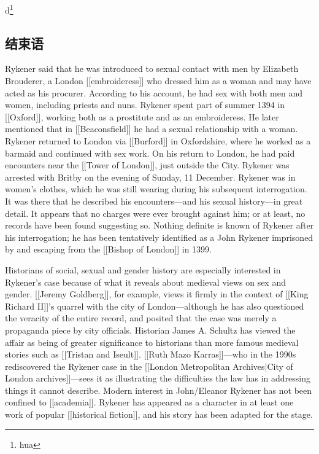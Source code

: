 \documentclass[11pt,a4paper,oneside]{article}
\newcommand{\zhconclusion}{\section*{\heiti\large 结束语}%
\addcontentsline{toc}{section}{\hspace{-1.8pc}\heiti 结束语}}%
\newenvironment{chineseconclusion}{\begin{chconclusion}\zhconclusion}%
{\vspace{1ex}\\ \end{chconclusion}}
\begin{document}
d\footnote{hua}
\newpage
\begin{chineseconclusion}
  Rykener said that he was introduced to sexual contact with men by Elizabeth Brouderer, a London [[embroideress]] who dressed him as a woman and may have acted as his procurer. According to his account, he had sex with both men and women, including priests and nuns. Rykener spent part of summer 1394 in [[Oxford]], working both as a prostitute and as an embroideress. He later mentioned that in [[Beaconsfield]] he had a sexual relationship with a woman. Rykener returned to London via [[Burford]] in Oxfordshire, where he worked as a barmaid and continued with sex work. On his return to London, he had paid encounters near the [[Tower of London]], just outside the City. Rykener was arrested with Britby on the evening of Sunday, 11 December. Rykener was in women's clothes, which he was still wearing during his subsequent interrogation. It was there that he described his encounters—and his sexual history—in great detail. It appears that no charges were ever brought against him; or at least, no records have been found suggesting so. Nothing definite is known of Rykener after his interrogation; he has been tentatively identified as a John Rykener imprisoned by and escaping from the [[Bishop of London]] in 1399.

  Historians of social, sexual and gender history are especially interested in Rykener's case because of what it reveals about medieval views on sex and gender. [[Jeremy Goldberg]], for example, views it firmly in the context of [[King Richard II]]'s quarrel with the city of London—although he has also questioned the veracity of the entire record, and posited that the case was merely a propaganda piece by city officials. Historian James A. Schultz has viewed the affair as being of greater significance to historians than more famous medieval stories such as [[Tristan and Iseult]]. [[Ruth Mazo Karras]]—who in the 1990s rediscovered the Rykener case in the [[London Metropolitan Archives|City of London archives]]—sees it as illustrating the difficulties the law has in addressing things it cannot describe. Modern interest in John/Eleanor Rykener has not been confined to [[academia]]. Rykener has appeared as a character in at least one work of popular [[historical fiction]], and his story has been adapted for the stage.  
\end{chineseconclusion}

\phantom{empty}

\printbibliography[heading=mybibintoc,env=mypubs,title=参考文献]
\end{document}
